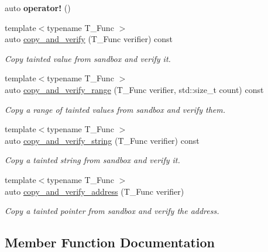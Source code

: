 \begin{DoxyCompactItemize}
\mbox{\label{classrlbox_1_1tainted__base__impl_a05eaec33cccaad9bc15e014d6c25d695}} 
auto {\bfseries operator!} ()
\item 
{\footnotesize template$<$typename T\+\_\+\+Func $>$ }\\auto \hyperlink{classrlbox_1_1tainted__base__impl_a701759aedd637f48cc97a0e6ada1c8a6}{copy\+\_\+and\+\_\+verify} (T\+\_\+\+Func verifier) const
\begin{DoxyCompactList}\small\item\em Copy tainted value from sandbox and verify it. \end{DoxyCompactList}\item 
{\footnotesize template$<$typename T\+\_\+\+Func $>$ }\\auto \hyperlink{classrlbox_1_1tainted__base__impl_a76e49089d448ba0cfa7ef6d7c1e2d288}{copy\+\_\+and\+\_\+verify\+\_\+range} (T\+\_\+\+Func verifier, std\+::size\+\_\+t count) const
\begin{DoxyCompactList}\small\item\em Copy a range of tainted values from sandbox and verify them. \end{DoxyCompactList}\item 
{\footnotesize template$<$typename T\+\_\+\+Func $>$ }\\auto \hyperlink{classrlbox_1_1tainted__base__impl_aa377cc4d0ea6768ada5032234ac89aab}{copy\+\_\+and\+\_\+verify\+\_\+string} (T\+\_\+\+Func verifier) const
\begin{DoxyCompactList}\small\item\em Copy a tainted string from sandbox and verify it. \end{DoxyCompactList}\item 
{\footnotesize template$<$typename T\+\_\+\+Func $>$ }\\auto \hyperlink{classrlbox_1_1tainted__base__impl_ad34419b3444d0bf37e25ecf7d37fbe0b}{copy\+\_\+and\+\_\+verify\+\_\+address} (T\+\_\+\+Func verifier)
\begin{DoxyCompactList}\small\item\em Copy a tainted pointer from sandbox and verify the address. \end{DoxyCompactList}\end{DoxyCompactItemize}


\subsection{Member Function Documentation}
\mbox{\label{classrlbox_1_1tainted__base__impl_a701759aedd637f48cc97a0e6ada1c8a6}} 
